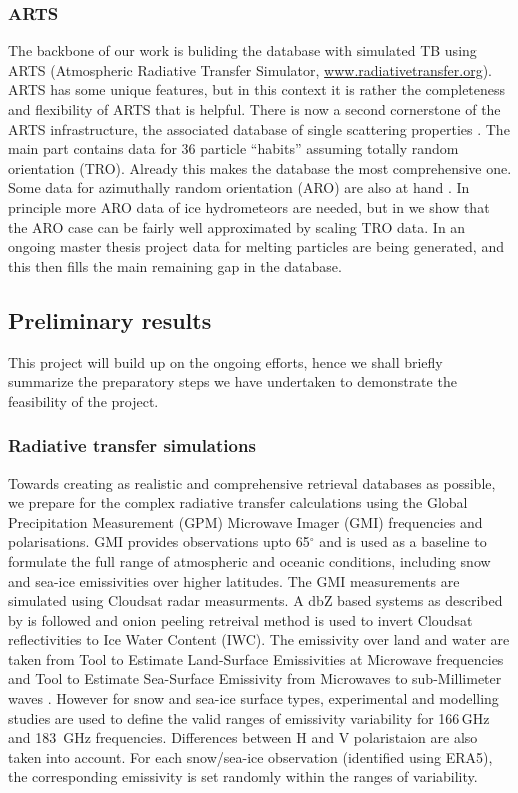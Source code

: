 \documentclass[12pt,oneside,a4paper]{article}
\begin{document}
\subsubsection{ARTS}
\label{sec:arts}
% 
The backbone of our work is buliding the database with simulated TB using ARTS (Atmospheric Radiative Transfer Simulator, \url{www.radiativetransfer.org}). ARTS has some unique features, but in this context it is rather the completeness and flexibility of ARTS that is
helpful. There is now a second cornerstone of the ARTS infrastructure, the
associated database of single scattering properties \citep{eriksson:agene:18}.
The main part contains data for 36 particle ``habits'' assuming totally random
orientation (TRO). Already this makes the database the most comprehensive one.
Some data for azimuthally random orientation (ARO) are also at hand
\citep{brath:micro:20,ekelund:micro:20}. In principle more ARO data of ice
hydrometeors are needed, but in \citet{baralakas:intro:21} we show that the ARO
case can be fairly well approximated by scaling TRO data. In an ongoing master
thesis project data for melting particles are being generated, and this then
fills the main remaining gap in the database.

\subsection{Preliminary results}
%
This project will build up on the ongoing efforts, hence we shall briefly summarize the preparatory steps we have undertaken to demonstrate the feasibility of the project. 

\subsubsection{Radiative transfer simulations}
%
Towards creating as realistic and comprehensive retrieval databases as possible, we prepare for the complex radiative transfer calculations using the Global Precipitation Measurement (GPM) Microwave Imager (GMI) frequencies and polarisations. GMI provides observations upto 65$^{\circ}$ and is used as a baseline to formulate the full range of atmospheric and oceanic conditions, including snow and sea-ice emissivities over higher latitudes. The GMI measurements are simulated using Cloudsat radar measurments. A dbZ based systems as described by \citet{ekelund:using:20} is followed and onion peeling retreival method is used to invert Cloudsat reflectivities to Ice Water Content (IWC). The emissivity over land and water are taken from Tool to Estimate Land-Surface Emissivities at Microwave frequencies \citep{aires} and Tool to Estimate Sea-Surface Emissivity from Microwaves to sub-Millimeter waves \citep{prigent}. However for snow and sea-ice surface types, experimental and modelling studies \citep{harlow:2009:milli, harlow:2012:tundr,hewison:2002:airbo} are used to define the valid ranges of emissivity variability for 166\,GHz and 183 \,GHz frequencies. Differences between H and V polaristaion are also taken into account. For each snow/sea-ice observation (identified using ERA5), the corresponding emissivity is set randomly within the ranges of variability.
\end{document}
